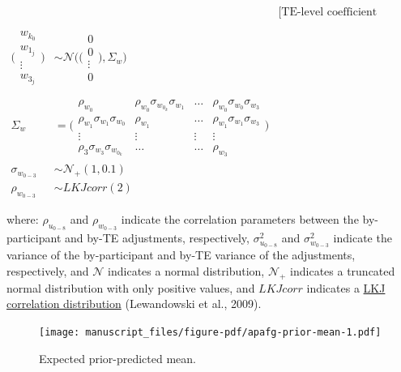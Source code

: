 \documentclass[
  man,
  floatsintext,
  colorlinks=true,linkcolor=blue,citecolor=blue,urlcolor=blue,biblatex]{apa7}
\begin{document}
\begin{equation}
{\begin{aligned}
\\
&&\mbox{[TE-level coefficient variability]} \\ \\
\Bigg(\begin{smallmatrix}
w_{k_{0}}\\ 
w_{1_{j}} \\ 
\vdots \\ 
w_{3_{j}} 
\end{smallmatrix}\Bigg) &\sim \mathcal{N} \Bigg(\Bigg(\begin{smallmatrix}
0\\ 
0 \\ 
\vdots \\
0 
\end{smallmatrix}\Bigg), \Sigma_{w}\Bigg) \\
\Sigma_{w} &= \Bigg(\begin{smallmatrix} \\
\rho_{w_{0}} & \rho_{w_{0}} \sigma_{w_{0_{k}}} \sigma_{w_{1}} & \dots & \rho_{w_{0}} \sigma_{w_{0}} \sigma_{w_{3}}\\ 
\rho_{w_{1}} \sigma_{w_{1}} \sigma_{w_{0}} & \rho_{w_{1}} & \dots & \rho_{w_{1}} \sigma_{w_{1}} \sigma_{w_{3}}\\ 
\vdots & \vdots & \vdots & \vdots \\
\rho_{3} \sigma_{w_{3}} \sigma_{w_{0_{k}}} & \dots & \dots & \rho_{w_{3}} \end{smallmatrix}\Bigg) \\
\sigma_{w_{0-3}} &\sim \mathcal{N_{+}}(1, 0.1) \\
\rho_{w_{0-3}} &\sim LKJcorr(2)
\end{aligned}
}\label{eq-prior}\end{equation}

where: \(\rho_{u_{0-8}}\) and \(\rho_{w_{0-3}}\) indicate the
correlation parameters between the by-participant and by-TE adjustments,
respectively, \(\sigma_{u_{0-8}}^2\) and \(\sigma_{w_{0-3}}^2\) indicate
the variance of the by-participant and by-TE variance of the
adjustments, respectively, and \(\mathcal{N}\) indicates a normal
distribution, \(\mathcal{N}_{+}\) indicates a truncated normal
distribution with only positive values, and \(LKJcorr\) indicates a
\href{https://mc-stan.org/docs/2_22/functions-reference/lkj-correlation.html}{LKJ
correlation distribution} (Lewandowski et al., 2009).

\begin{figure}[h!]
\caption{Expected prior-predicted mean.}
\label{apafg-prior-mean}
\texttt{[image: manuscript\_files/figure-pdf/apafg-prior-mean-1.pdf]}

\end{figure}
\end{document}
